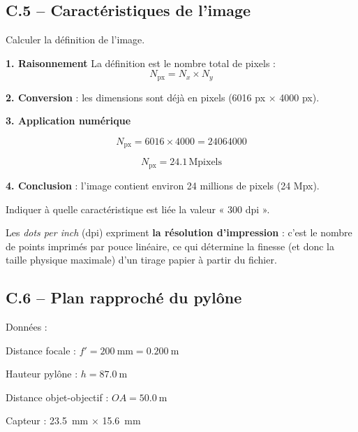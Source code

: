 \documentclass[answers]{exam}
\begin{document}
\begin{questions}
\begin{questions}
\end{questions}


\subsection*{C.5 – Caractéristiques de l’image}

\begin{questions}

\question[C.5.1] Calculer la définition de l’image.

  \begin{solution}
  \textbf{1. Raisonnement}  
  La définition est le nombre total de pixels :
  \[
    N_{\text{px}} = N_x \times N_y
  \]

  \textbf{2. Conversion} : les dimensions sont déjà en pixels (\num{6016} px × \num{4000} px).

  \textbf{3. Application numérique}  

  \[
    N_{\text{px}} = 6016 \times 4000 = 24064000
  \]

  \[
    \boxed{N_{\text{px}} = \num{24,1}\,\text{Mpixels}}
  \]

  \textbf{4. Conclusion} : l’image contient environ \num{24} millions de pixels (24 Mpx).  
  \end{solution}



\question[C.5.2] Indiquer à quelle caractéristique est liée la valeur « 300 dpi ».

  \begin{solution}
  Les \emph{dots per inch} (dpi) expriment \textbf{la résolution d’impression} : c’est le nombre de points imprimés par pouce linéaire, ce qui détermine la finesse (et donc la taille physique maximale) d’un tirage papier à partir du fichier.  
  \end{solution}

\end{questions}


\subsection*{C.6 – Plan rapproché du pylône}

Données :  
\begin{compactitem}
  \item Distance focale : $f' = \SI{200}{\milli\metre} = \SI{0.200}{\metre}$  
  \item Hauteur pylône : $h = \SI{87.0}{\metre}$  
  \item Distance objet-objectif : $OA = \SI{50.0}{\metre}$  
  \item Capteur : \SI{23.5}{\milli\metre} × \SI{15.6}{\milli\metre}
\end{compactitem}


\end{questions}
\end{document}
